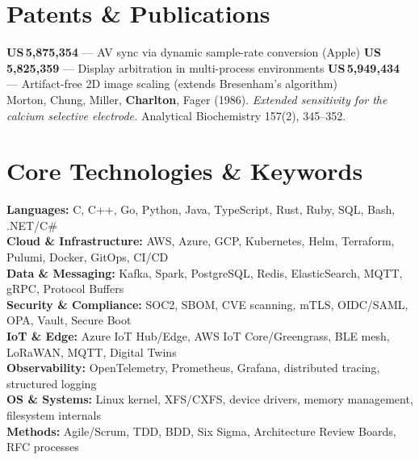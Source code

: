 \documentclass[letterpaper,10.5pt]{article}
\begin{document}
\section{Patents \& Publications}
\small
\textbf{US\,5,875,354} — AV sync via dynamic sample-rate conversion (Apple) \quad
\textbf{US\,5,825,359} — Display arbitration in multi-process environments \quad
\textbf{US\,5,949,434} — Artifact-free 2D image scaling (extends Bresenham's algorithm) \\[2pt]
Morton, Chung, Miller, \textbf{Charlton}, Fager (1986). \textit{Extended sensitivity for the calcium selective electrode.} Analytical Biochemistry 157(2), 345--352.

\section{Core Technologies \& Keywords}
\small

\textbf{Languages:} C, C++, Go, Python, Java, TypeScript, Rust, Ruby, SQL, Bash, .NET/C\# \\
\textbf{Cloud \& Infrastructure:} AWS, Azure, GCP, Kubernetes, Helm, Terraform, Pulumi, Docker, GitOps, CI/CD \\
\textbf{Data \& Messaging:} Kafka, Spark, PostgreSQL, Redis, ElasticSearch, MQTT, gRPC, Protocol Buffers \\
\textbf{Security \& Compliance:} SOC2, SBOM, CVE scanning, mTLS, OIDC/SAML, OPA, Vault, Secure Boot \\
\textbf{IoT \& Edge:} Azure IoT Hub/Edge, AWS IoT Core/Greengrass, BLE mesh, LoRaWAN, MQTT, Digital Twins \\
\textbf{Observability:} OpenTelemetry, Prometheus, Grafana, distributed tracing, structured logging \\
\textbf{OS \& Systems:} Linux kernel, XFS/CXFS, device drivers, memory management, filesystem internals \\
\textbf{Methods:} Agile/Scrum, TDD, BDD, Six Sigma, Architecture Review Boards, RFC processes \\
\end{document}
